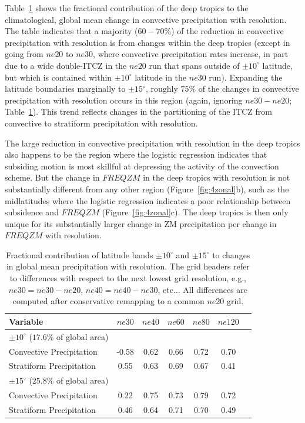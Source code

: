 \documentclass[times]{qjrms4}
\begin{document}
Table~\ref{tbl:table2} shows the fractional contribution of the deep tropics to the climatological, global mean change in convective precipitation with resolution. The table indicates that a majority ($60-70 \%$) of the reduction in convective precipitation with resolution is from changes within the deep tropics (except in going from $ne20$ to $ne30$, where convective precipitation rates increase, in part due to a wide double-ITCZ in the $ne20$ run that spans outside of $\pm 10^{\circ}$ latitude, but which is contained within $\pm 10^{\circ}$ latitude in the $ne30$ run). Expanding the latitude boundaries marginally to $\pm 15^{\circ}$, roughly $75\%$ of the changes in convective precipitation with resolution occurs in this region (again, ignoring $ne30-ne20$; Table~\ref{tbl:table2}). This trend reflects changes in the partitioning of the ITCZ from convective to stratiform precipitation with resolution. 

The large reduction in convective precipitation with resolution in the deep tropics also happens to be the region where the logistic regression indicates that subsiding motion is most skillful at depressing the activity of the convection scheme. But the change in $FREQZM$ in the deep tropics with resolution is not substantially different from any other region (Figure~\ref{fig:4zonal}b), such as the midlatitudes where the logistic regression indicates a poor relationship between subsidence and $FREQZM$ (Figure~\ref{fig:4zonal}c). The deep tropics is then only unique for its substantially larger change in ZM precipitation per change in $FREQZM$ with resolution.

 \begin{table}
 \caption{Fractional contribution of latitude bands $\pm 10^{\circ}$ and $\pm 15^{\circ}$ to changes in global mean precipitation with resolution. The grid headers refer to differences with respect to the next lowest grid resolution, e.g., $ne30 = ne30-ne20$, $ne40=ne40-ne30$, etc... All differences are computed after conservative remapping to a common $ne20$ grid.}
 \centering
 \scriptsize
 \begin{tabular}{lcccccc}
   \hline
   Variable & $ne30$ & $ne40$ & $ne60$ & $ne80$ & $ne120$ \\ 
   \hline
   $\pm 10^{\circ}$ ($17.6\%$ of global area) \\
   Convective Precipitation & -0.58 & 0.62 & 0.66 & 0.72 & 0.70 \\
   Stratiform Precipitation & 0.55 & 0.63 & 0.69 & 0.67 & 0.41 \\ 
   \hline
   $\pm 15^{\circ}$ ($25.8\%$ of global area) \\
   Convective Precipitation & 0.22 & 0.75 & 0.73 & 0.79 & 0.72 \\
   Stratiform Precipitation & 0.46 & 0.64 & 0.71 & 0.70 & 0.49 \\      
 \hline
 \end{tabular}
 \label{tbl:table2}
 \end{table}
\end{document}

